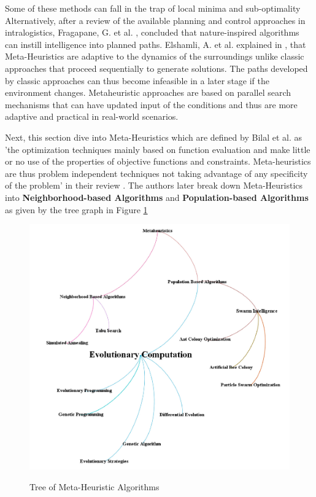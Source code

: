 Some of these methods can fall in the trap of local minima and sub-optimality \cite{R12}
Alternatively, after a review of the available planning and control approaches in intralogistics, Fragapane, G. et al. \cite{R7}, 
concluded that nature-inspired algorithms can instill intelligence into planned paths.
Elshamli, A. et al. explained in \cite{R17}, that Meta-Heuristics are adaptive to the dynamics of the surroundings
unlike classic approaches that proceed sequentially to generate solutions. The paths developed by classic approaches
can thus become infeasible in a later stage if the environment changes. Metaheuristic approaches are based 
on parallel search mechanisms that can have updated input of the conditions and thus are more adaptive and 
practical in real-world scenarios.

Next, this section dive into Meta-Heuristics which are defined by Bilal et al. as 'the optimization
techniques mainly based on function evaluation and make little
or no use of the properties of objective functions and constraints.
Meta-heuristics are thus problem independent techniques not taking
advantage of any specificity of the problem’ in their review \cite{R37}.
The authors later break down Meta-Heuristics into \textbf{Neighborhood-based Algorithms} and \textbf{Population-based Algorithms}
as given by the tree graph in Figure \ref{Tree}

\begin{figure}[H]
    \begin{center}
        \includegraphics[width=\linewidth]{images/Chap1/Tree_Metaheuristic.png}\\
        \caption{Tree of Meta-Heuristic Algorithms \cite{R37}}
        \label{Tree}
    \end{center}
\end{figure}

